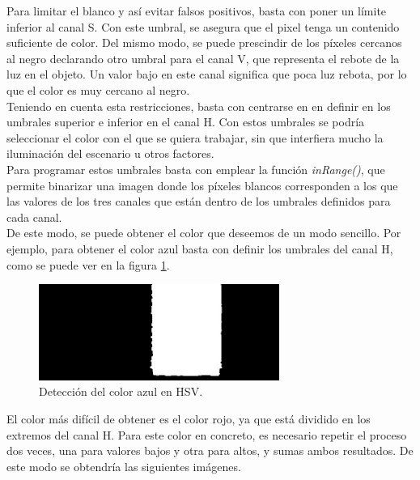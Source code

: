 Para limitar el blanco y así evitar falsos positivos, basta con poner un límite inferior al canal S. Con este umbral, se asegura que el pixel tenga un contenido suficiente de color. Del mismo modo, se puede prescindir de los píxeles cercanos al negro declarando otro umbral para el canal V, que representa el rebote de la luz en el objeto. Un valor bajo en este canal significa que poca luz rebota, por lo que el color es muy cercano al negro.\\

Teniendo en cuenta esta restricciones, basta con centrarse en en definir en los umbrales superior e inferior en el canal H. Con estos umbrales se podría seleccionar el color con el que se quiera trabajar, sin que interfiera mucho la iluminación del escenario u otros factores.\\

Para programar estos umbrales basta con emplear la función \textit{inRange()}, que permite binarizar una imagen donde los píxeles blancos corresponden a los que las valores de los tres canales que están dentro de los umbrales definidos para cada canal.\\

De este modo, se puede obtener el color que deseemos de un modo sencillo. Por ejemplo, para obtener el color azul basta con definir los umbrales del canal H, como se puede ver en la figura \ref{azulhsv}.\\
\begin{figure}[h]
\centering
\includegraphics[width=0.7\textwidth]{images/azul.jpg}%
\caption{Detección del color azul en HSV.}
\label{azulhsv}
\end{figure}
\FloatBarrier
El color más difícil de obtener es el color rojo, ya que está dividido en los extremos del canal H. Para este color en concreto, es necesario repetir el proceso dos veces, una para valores bajos y otra para altos, y sumas ambos resultados. De este modo se obtendría las siguientes imágenes.\\

